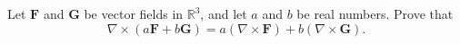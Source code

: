 \begin{problem}
Let $\mathbf{F}$ and $\mathbf{G}$ be vector fields in $\mathbb{R}^3$, and let $a$ and $b$ be real numbers. Prove that 
\[
\nabla\times(a\mathbf{F}+b\mathbf{G}) = a(\nabla\times\mathbf{F})+b(\nabla\times\mathbf{G}).
\]
\end{problem}